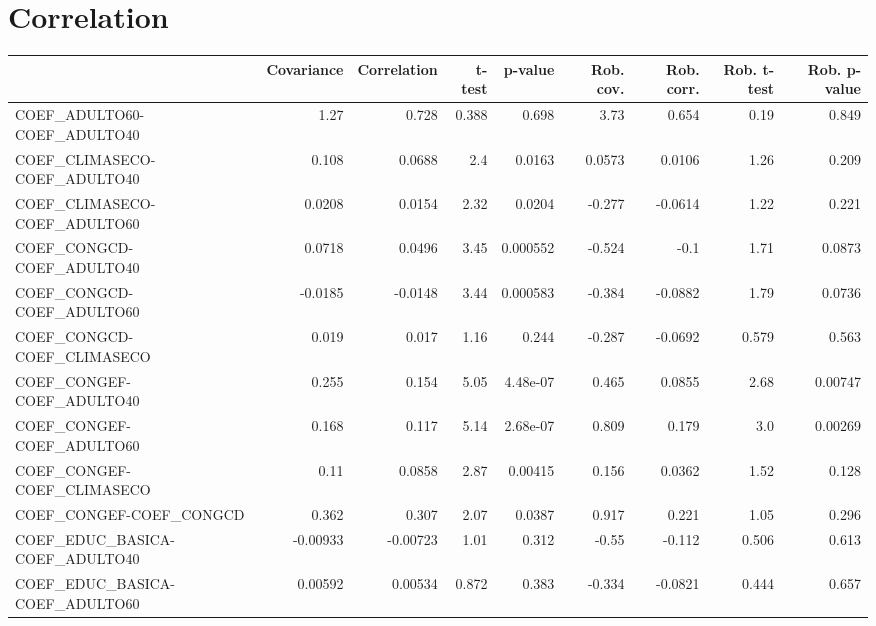 \section{Correlation}
\begin{tabular}{lrrrrrrrr}
\toprule
{} &  Covariance &  Correlation &  t-test &  p-value &  Rob. cov. &  Rob. corr. &  Rob. t-test &  Rob. p-value \\
\midrule
COEF\_ADULTO60-COEF\_ADULTO40           &        1.27 &        0.728 &   0.388 &    0.698 &       3.73 &       0.654 &         0.19 &         0.849 \\
COEF\_CLIMASECO-COEF\_ADULTO40          &       0.108 &       0.0688 &     2.4 &   0.0163 &     0.0573 &      0.0106 &         1.26 &         0.209 \\
COEF\_CLIMASECO-COEF\_ADULTO60          &      0.0208 &       0.0154 &    2.32 &   0.0204 &     -0.277 &     -0.0614 &         1.22 &         0.221 \\
COEF\_CONGCD-COEF\_ADULTO40             &      0.0718 &       0.0496 &    3.45 & 0.000552 &     -0.524 &        -0.1 &         1.71 &        0.0873 \\
COEF\_CONGCD-COEF\_ADULTO60             &     -0.0185 &      -0.0148 &    3.44 & 0.000583 &     -0.384 &     -0.0882 &         1.79 &        0.0736 \\
COEF\_CONGCD-COEF\_CLIMASECO            &       0.019 &        0.017 &    1.16 &    0.244 &     -0.287 &     -0.0692 &        0.579 &         0.563 \\
COEF\_CONGEF-COEF\_ADULTO40             &       0.255 &        0.154 &    5.05 & 4.48e-07 &      0.465 &      0.0855 &         2.68 &       0.00747 \\
COEF\_CONGEF-COEF\_ADULTO60             &       0.168 &        0.117 &    5.14 & 2.68e-07 &      0.809 &       0.179 &          3.0 &       0.00269 \\
COEF\_CONGEF-COEF\_CLIMASECO            &        0.11 &       0.0858 &    2.87 &  0.00415 &      0.156 &      0.0362 &         1.52 &         0.128 \\
COEF\_CONGEF-COEF\_CONGCD               &       0.362 &        0.307 &    2.07 &   0.0387 &      0.917 &       0.221 &         1.05 &         0.296 \\
COEF\_EDUC\_BASICA-COEF\_ADULTO40        &    -0.00933 &     -0.00723 &    1.01 &    0.312 &      -0.55 &      -0.112 &        0.506 &         0.613 \\
COEF\_EDUC\_BASICA-COEF\_ADULTO60        &     0.00592 &      0.00534 &   0.872 &    0.383 &     -0.334 &     -0.0821 &        0.444 &         0.657 \\

\end{tabular}
